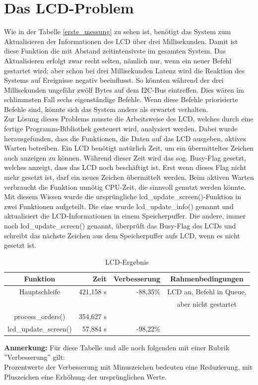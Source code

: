 \section{Das LCD-Problem\label{chapter_lcd_problem}}
Wie in der Tabelle \ref{erste_messung} zu sehen ist, benötigt das System zum Aktualisieren der Informationen
des LCD über drei Millisekunden. Damit ist diese Funktion die mit Abstand zeitintensivste im gesamten System.
Das Aktualisieren erfolgt zwar recht selten, nämlich nur, wenn ein neuer Befehl gestartet wird; aber schon
bei drei Millisekunden Latenz wird die Reaktion des Systems auf Ereignisse negativ beeinflusst.
So könnten während der drei Millisekunden ungefähr zwölf Bytes auf dem I2C-Bus eintreffen.
Dies wären im schlimmsten Fall sechs eigenständige Befehle.
Wenn diese Befehle priorisierte Befehle sind, könnte sich das System anders als erwartet verhalten.\\
Zur Lösung dieses Problems musste die Arbeitsweise des LCD, welches durch eine fertige Programm-Bibliothek
gesteuert wird, analysiert werden. 
Dabei wurde herausgefunden, dass die Funktionen, die Daten auf das LCD ausgeben,
aktives Warten betreiben. Ein LCD benötigt natürlich Zeit, um ein übermitteltes Zeichen auch anzeigen zu können.
Während dieser Zeit wird das sog. Busy-Flag gesetzt, welches anzeigt, dass das LCD noch beschäftigt ist. Erst
wenn dieses Flag nicht mehr gesetzt ist, darf ein neues Zeichen übermittelt werden. Beim aktiven Warten verbraucht die
Funktion unnötig CPU-Zeit, die sinnvoll genutzt werden könnte.\\
Mit diesem Wissen wurde die ursprüngliche lcd\_\-update\_\-screen()-Funktion in zwei Funktionen aufgeteilt. Die eine
wurde lcd\_\-update\_\-info() genannt und aktualisiert die LCD-Informationen in einem Speicherpuffer. Die andere,
immer noch lcd\_\-update\_\-screen() genannt, überprüft das Busy-Flag des LCDs und schreibt das nächste Zeichen aus
dem Speicherpuffer aufs LCD, wenn es nicht gesetzt ist.
\begin{table}[htb]
\begin{center}
	\begin{tabular}{|c||r|r|c|}
		\hline
		\textbf{Funktion} & \textbf{Zeit} & \textbf{Verbesserung} & \textbf{Rahmenbedingungen} \\ \hline \hline
		Hauptschleife & 421,158 \textmu{}s & -88,35\% & LCD an, Befehl in Queue,\\
		& & & aber nicht gestartet \\ \hline
		process\_orders() & 354,627 \textmu{}s & & \\ \hline
		lcd\_update\_screen() & 57,884 \textmu{}s & -98,22\% & \\ \hline
	\end{tabular}
	\caption{\label{lcd_opt} LCD-Ergebnis}
\end{center}
\textbf{Anmerkung:} Für diese Tabelle und alle noch folgenden mit einer Rubrik ''Verbesserung'' gilt:\\
Prozentwerte der Verbesserung mit Minuszeichen bedeuten eine Reduzierung, mit Pluszeichen eine Erhöhung
der ursprünglichen Werte.
\end{table}
